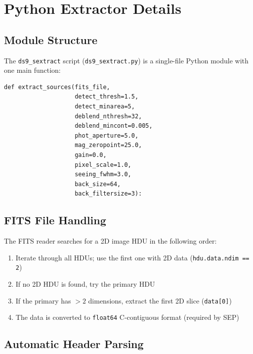 \documentclass[11pt,fleqn]{book}
\newcommand{\sextract}{\texttt{ds9\_sextract}}
\begin{document}
\chapter{Python Extractor Details}
\label{ch:python}

\section{Module Structure}

The \sextract{} script (\texttt{ds9\_sextract.py}) is a single-file Python module with one main function:

\begin{codebox}
\begin{lstlisting}[style=python,numbers=none]
def extract_sources(fits_file,
                    detect_thresh=1.5,
                    detect_minarea=5,
                    deblend_nthresh=32,
                    deblend_mincont=0.005,
                    phot_aperture=5.0,
                    mag_zeropoint=25.0,
                    gain=0.0,
                    pixel_scale=1.0,
                    seeing_fwhm=3.0,
                    back_size=64,
                    back_filtersize=3):
\end{lstlisting}
\end{codebox}

\section{FITS File Handling}

The FITS reader searches for a 2D image HDU in the following order:

\begin{enumerate}[leftmargin=2em]
  \item Iterate through all HDUs; use the first one with 2D data (\texttt{hdu.data.ndim == 2})
  \item If no 2D HDU is found, try the primary HDU
  \item If the primary has $>2$ dimensions, extract the first 2D slice (\texttt{data[0]})
  \item The data is converted to \texttt{float64} C-contiguous format (required by SEP)
\end{enumerate}

\section{Automatic Header Parsing}
\end{document}
